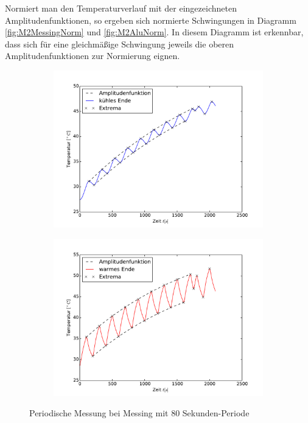 Normiert man den Temperaturverlauf mit der eingezeichneten Amplitudenfunktionen, so ergeben sich normierte Schwingungen in Diagramm \ref{fig:M2MessingNorm} und \ref{fig:M2AluNorm}. In diesem Diagramm ist erkennbar, dass sich für eine gleichmäßige Schwingung jeweils die oberen Amplitudenfunktionen zur Normierung eignen.

\begin{figure}[htp]
\label{fig:M2Messing}
\centering
	\begin{subfigure}{0.9\textwidth}
	\includegraphics[width=\textwidth]{Bilder/M2_Messing_kuehl.pdf}
	\end{subfigure}
	\begin{subfigure}{0.9\textwidth}
	\includegraphics[width=\textwidth]{Bilder/M2_Messing_warm.pdf}
	\end{subfigure}
\caption{Periodische Messung bei Messing mit 80 Sekunden-Periode}
\end{figure}
